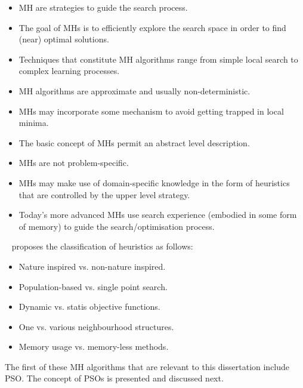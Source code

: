 \begin{itemize}
      \item \ac{MH} are strategies to guide the search process.

      \item The goal of \acp{MH} is to efficiently explore the search space in order to find (near) optimal solutions.

      \item Techniques that constitute \ac{MH} algorithms range from simple local search to complex learning processes.

      \item \ac{MH} algorithms are approximate and usually non-deterministic.

      \item \acp{MH} may incorporate some mechanism to avoid getting trapped in local minima.

      \item The basic concept of \acp{MH} permit an abstract level description.

      \item \acp{MH} are not problem-specific.

      \item \acp{MH} may make use of domain-specific knowledge  in the form of heuristics that are controlled by the upper level strategy.

      \item Today's more advanced \acp{MH} use search experience (embodied in some form of memory) to guide the search/optimisation process.
\end{itemize}

\citeauthor{ref:blum:2003}~\cite{ref:blum:2003} proposes the classification of heuristics as follows:

\begin{itemize}
      \item Nature inspired vs. non-nature inspired.
      \item Population-based vs. single point search.
      \item Dynamic vs. statis objective functions.
      \item One vs. various neighbourhood structures.
      \item Memory usage vs. memory-less methods.
\end{itemize}

The first of these \ac{MH} algorithms that are relevant to this dissertation include \ac{PSO}. The concept of \acp{PSO} is presented and discussed next.


